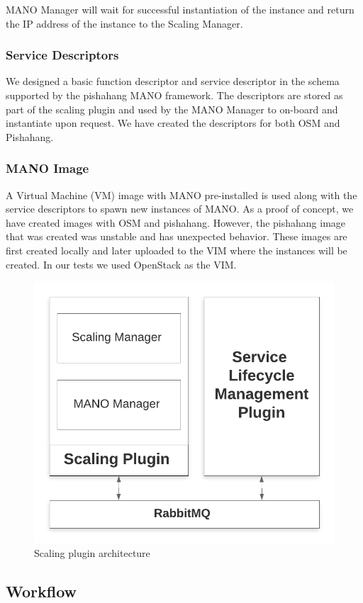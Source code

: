 MANO Manager will wait for successful instantiation of the instance and return the IP address of the instance to the Scaling Manager.

\subsubsection*{Service Descriptors}

We designed a basic function descriptor and service descriptor in the schema supported by the pishahang MANO framework. The descriptors are stored as part of the scaling plugin and used by the MANO Manager to on-board and instantiate upon request. We have created the descriptors for both OSM and Pishahang.

\subsubsection*{MANO Image}

A Virtual Machine (VM) image with MANO pre-installed is used along with the service descriptors to spawn new instances of MANO. As a proof of concept, we have created images with OSM and pishahang. However, the pishahang image that was created was unstable and has unexpected behavior. These images are first created locally and later uploaded to the VIM where the instances will be created. In our tests we used OpenStack as the VIM.

\begin{figure}[h]
	\centering
	\includegraphics[width=0.7\linewidth]{figures/scalingarch}
	\caption{Scaling plugin architecture}
	\label{fig:scalingarch}
\end{figure}


\subsection{Workflow}

